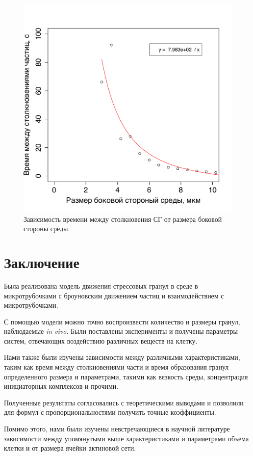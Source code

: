 \documentclass[14pt,a4paper]{extarticle}
\begin{document}
\begin{figure}[htbp]\centering
\includegraphics[width=0.9\columnwidth]{../results/P2pCollisionTimeOnVolumeExperiment.pdf}
\caption{Зависимость времени между столкновения СГ от размера боковой стороны среды.}
\label{fig:P2pCollisionTimeOnVolumeExperiment}
\end{figure}


\section{Заключение}
Была реализована модель движения стрессовых гранул в среде в микротрубочками с броуновским движением частиц и взаимодействием с микротрубочками.

С помощью модели можно точно воспроизвести количество и размеры гранул, наблюдаемые \emph{in vivo}. Были поставлены эксперименты и получены параметры систем, отвечающих воздействию различных веществ на клетку.

Нами также были изучены зависимости между различными характеристиками, таким как время между столкновениями части и время образования гранул определенного размера и параметрами, такими как вязкость среды, концентрация инициаторных комплексов и прочими.

Полученные результаты согласовались с теоретическими выводами и позволили для формул с пропорциональностями получить точные коэффициенты.

Помимо этого, нами были изучены невстречающиеся в научной литературе зависимости между упомянутыми выше характеристиками и параметрами объема клетки и от размера ячейки актиновой сети.
\end{document}
